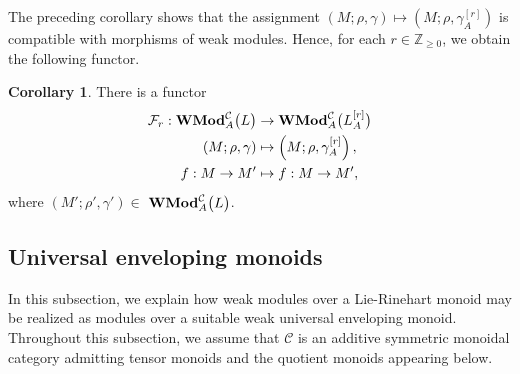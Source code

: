 \documentclass[11pt]{amsart}
\newcommand{\calC}{\mathcal{C}}
\theoremstyle{definition}
\newtheorem{coro}[theo]{Corollary}
\numberwithin{equation}{section}
\begin{document}
The preceding corollary shows that the assignment
$(M;\rho,\gamma)\longmapsto (M;\rho,\gamma_A^{[r]})$
is compatible with morphisms of weak modules. Hence, for each
$r\in \mathbb{Z}_{\geq 0}$, we obtain the following functor.		
\begin{coro}\label{weakfunctor}
There is a functor 
\begin{align*}
				\mathcal{F}_r:  {\bf WMod}^{\calC}_A{\big(L\big)} &\to {\bf WMod}^{\calC}_A{\big(L_A^{[r]}\big)}\\
				(M;\rho,\gamma) &\mapsto \left(M; \rho, \gamma_A^{[r]}\right),\\
				f:M\to M' &\mapsto f: M \to M',
\end{align*}
where $(M';\rho',\gamma') \in $ ${\bf WMod}^{\calC}_A{\big(L\big)}$. 
\end{coro}

\subsection{Universal enveloping monoids}

In this subsection, we explain how weak modules over a Lie-Rinehart monoid may be realized
as modules over a suitable weak universal enveloping monoid. Throughout this
subsection, we assume that $\mathcal C$ is an additive symmetric monoidal
category admitting tensor monoids and the quotient monoids appearing below.
\end{document}
